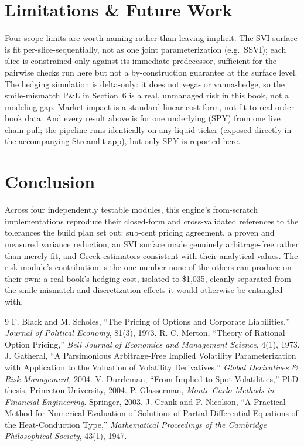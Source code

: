 \documentclass[10pt]{article}
\begin{document}
\section{Limitations \& Future Work}
Four scope limits are worth naming rather than leaving implicit. The SVI surface is fit per-slice-sequentially, not as one joint parameterization (e.g.\ SSVI); each slice is constrained only against its immediate predecessor, sufficient for the pairwise checks run here but not a by-construction guarantee at the surface level. The hedging simulation is delta-only: it does not vega- or vanna-hedge, so the smile-mismatch P\&L in Section~6 is a real, unmanaged risk in this book, not a modeling gap. Market impact is a standard linear-cost form, not fit to real order-book data. And every result above is for one underlying (SPY) from one live chain pull; the pipeline runs identically on any liquid ticker (exposed directly in the accompanying Streamlit app), but only SPY is reported here.

\section{Conclusion}
Across four independently testable modules, this engine's from-scratch implementations reproduce their closed-form and cross-validated references to the tolerances the build plan set out: sub-cent pricing agreement, a proven and measured variance reduction, an SVI surface made genuinely arbitrage-free rather than merely fit, and Greek estimators consistent with their analytical values. The risk module's contribution is the one number none of the others can produce on their own: a real book's hedging cost, isolated to \$1{,}035, cleanly separated from the smile-mismatch and discretization effects it would otherwise be entangled with.

{\small
\begin{thebibliography}{9}
 F. Black and M. Scholes, ``The Pricing of Options and Corporate Liabilities,'' \textit{Journal of Political Economy}, 81(3), 1973.
 R. C. Merton, ``Theory of Rational Option Pricing,'' \textit{Bell Journal of Economics and Management Science}, 4(1), 1973.
 J. Gatheral, ``A Parsimonious Arbitrage-Free Implied Volatility Parameterization with Application to the Valuation of Volatility Derivatives,'' \textit{Global Derivatives \& Risk Management}, 2004.
 V. Durrleman, ``From Implied to Spot Volatilities,'' PhD thesis, Princeton University, 2004.
 P. Glasserman, \textit{Monte Carlo Methods in Financial Engineering}. Springer, 2003.
 J. Crank and P. Nicolson, ``A Practical Method for Numerical Evaluation of Solutions of Partial Differential Equations of the Heat-Conduction Type,'' \textit{Mathematical Proceedings of the Cambridge Philosophical Society}, 43(1), 1947.
\end{thebibliography}
}
\end{document}
